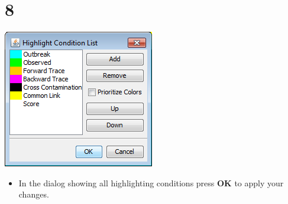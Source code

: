 \documentclass{beamer}
\begin{document}
\section{8}
\begin{frame}
	\begin{center}
  		\includegraphics[height=0.6\textheight]{8.png}
	\end{center}
	\begin{itemize}
		\item In the dialog showing all highlighting conditions press \textbf{OK} to apply your changes.
	\end{itemize}
\end{frame}
\end{document}
